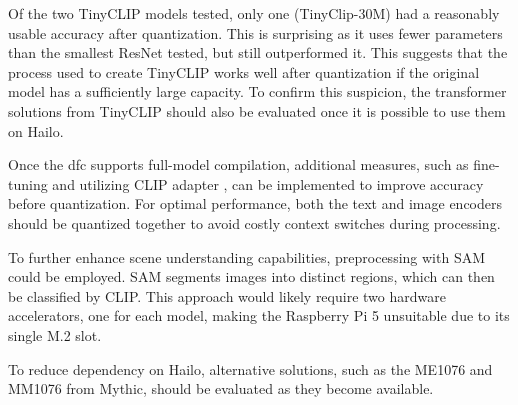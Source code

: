Of the two TinyCLIP models tested, only one (TinyClip-30M) had a reasonably usable accuracy after quantization.
This is surprising as it uses fewer parameters than the smallest ResNet tested, but still outperformed it.
This suggests that the process used to create TinyCLIP works well after quantization if the original model has a sufficiently large capacity.
To confirm this suspicion, the transformer solutions from TinyCLIP should also be evaluated once it is possible to use them on Hailo.

Once the \acrshort{dfc} supports full-model compilation, additional measures, such as fine-tuning and utilizing CLIP adapter \cite{clipadapter}, can be implemented to improve accuracy before quantization.  
For optimal performance, both the text and image encoders should be quantized together to avoid costly context switches during processing.  

To further enhance scene understanding capabilities, preprocessing with SAM \cite{sam} could be employed.  
SAM segments images into distinct regions, which can then be classified by CLIP.  
This approach would likely require two hardware accelerators, one for each model, making the Raspberry Pi 5 unsuitable due to its single M.2 slot.  

To reduce dependency on Hailo, alternative solutions, such as the ME1076 and MM1076 from Mythic, should be evaluated as they become available.  

